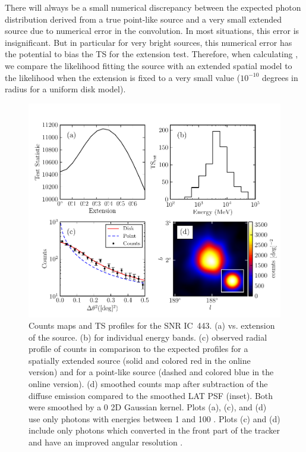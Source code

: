 There will always be a small numerical discrepancy between the expected
photon distribution derived from a true point-like source and a very
small extended source due to numerical error in the convolution.  In most
situations, this error is insignificant.  But in particular for very
bright sources, this numerical error has the potential to bias the TS
for the extension test. Therefore, when calculating \tsext, we compare
the likelihood fitting the source with an extended spatial model to the
likelihood when the extension is fixed to a very small value ($10^{-10}$
degrees in radius for a uniform disk model).

\begin{figure}[htbp]
  \includegraphics{chapters/extended_analysis/figures/ic443_plots/four_plots_ic443_color.pdf}
  \caption{Counts maps and TS profiles for the SNR IC~443. (a)
  \ts vs. extension of the source. (b) \tsext for individual energy
  bands. (c) observed radial profile of counts in comparison to the
  expected profiles for a spatially extended source (solid and colored
  red in the online version) and for a point-like source (dashed and
  colored blue in the online version).  (d) smoothed counts map after
  subtraction of the diffuse emission compared to the smoothed LAT
  PSF (inset). Both were smoothed by a 0 2D Gaussian kernel.
  Plots (a), (c), and (d) use only photons with energies between 1
  \gev and 100 \gev.  Plots (c) and (d) include only photons which
  converted in the front part of the tracker and have an improved
  angular resolution \citep{atwood_2009a_large-telescope}.}
\end{figure}

